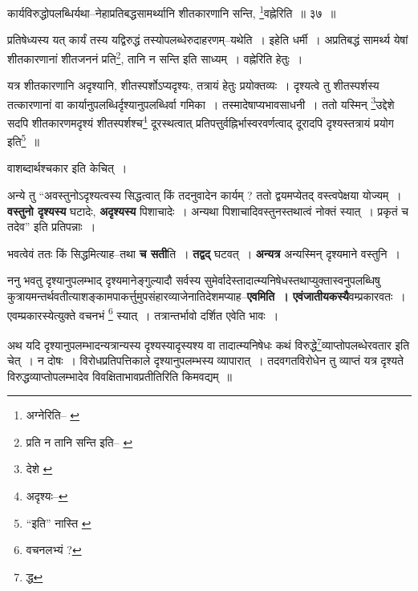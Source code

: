 \documentclass[article,12pt,a4paper]{memoir}
\begin{document}
	  \bigskip
	  \begingroup
	

	  \pstart कार्यविरुद्धोपलब्धिर्यथा--नेहाप्रतिबद्धसामर्थ्यानि शीतकारणानि सन्ति, \footnote{अग्नेरिति--\cite{dp-msB} \cite{dp-msC} \cite{dp-edP} \cite{dp-edH} \cite{dp-edE} \cite{dp-edN}}\-वह्नेरिति ॥ ३७ ॥
	\pend
      
	  \endgroup
	 

	  \pstart प्रतिषेध्यस्य यत् कार्यं तस्य यद्विरुद्धं तस्योपलब्धेरुदाहरणम्--यथेति । इहेति धर्मी । अप्रतिबद्धं सामर्थ्य येषां शीतकारणानां शीतजननं प्रति\footnote{प्रति न तानि सन्ति इति--\cite{dp-msA} \cite{dp-edP} \cite{dp-edH} \cite{dp-edE} \cite{dp-edN}}\-, तानि न सन्ति इति साध्यम् । वह्नेरिति हेतुः ।
	\pend
       

	  \pstart यत्र शीतकारणानि अदृश्यानि, शीतस्पर्शोऽप्यदृश्यः, तत्रायं हेतुः प्रयोक्तव्यः । दृश्यत्वे तु शीतस्पर्शस्य तत्कारणानां वा कार्यानुपलब्धिर्दृश्यानुपलब्धिर्वा गमिका । तस्मादेषाप्यभावसाधनी । ततो यस्मिन् \footnote{देशे \cite{dp-msA} \cite{dp-msB} \cite{dp-msC} \cite{dp-msD} \cite{dp-edP} \cite{dp-edH} \cite{dp-edE} \cite{dp-edN}}\-उद्देशे सदपि शीतकारणमदृश्यं शीतस्पर्शश्च\footnote{अदृश्यः--\cite{dp-msD-n}} दूरस्थत्वात् प्रतिपत्तुर्वह्निर्भास्वरवर्णत्वाद् दूरादपि दृश्यस्तत्रायं प्रयोग इति\footnote{“इति” नास्ति \cite{dp-msA} \cite{dp-msB} \cite{dp-edP} \cite{dp-edH} \cite{dp-edE} \cite{dp-edN}} ॥
	\pend
      
	  \endgroup
	

	  \pstart वाशब्दार्थश्चकार इति केचित् ।
	\pend
      

	  \pstart अन्ये तु “अवस्तुनोऽदृश्यत्वस्य सिद्धत्वात् किं तदनुवादेन कार्यम् ? ततो द्वयमप्येतद् वस्त्वपेक्षया योज्यम् । \textbf{वस्तुनो दृश्यस्य} घटादेः, \textbf{अदृश्यस्य} पिशाचादेः । अन्यथा पिशाचादिवस्तुनस्तथात्वं नोक्तं स्यात् । प्रकृतं च तदेव” इति प्रतिपन्नाः ।
	\pend
      

	  \pstart भवत्वेवं ततः किं सिद्धमित्याह--तथा \textbf{च सती}ति । \textbf{तद्वद्} घटवत् । \textbf{अन्य}\leavevmode{}\textbf{त्र} अन्यस्मिन् दृश्यमाने वस्तुनि ।
	\pend
      

	  \pstart ननु भवतु दृश्यानुपलम्भाद् दृश्यमानेङ्गुल्यादौ सर्वस्य सुमेर्वादेस्तादात्म्यनिषेधस्तथाप्युक्तास्वनुपलब्धिषु कुत्रायमन्तर्थवतीत्याशङ्कामपाकर्त्तुमुपसंहारव्याजेनातिदेशमप्याह--\textbf{एवमिति । एवंजातीयकस्यै}वम्प्रकारवतः । एवम्प्रकारस्येत्युक्ते वचनभं \footnote{वचनलभ्यं ?} स्यात् । तत्रान्तर्भावो दर्शित एवेति भावः ।
	\pend
      

	  \pstart अथ यदि दृश्यानुपलम्भादन्यत्रान्यस्य दृश्यस्यादृस्यश्य वा तादात्म्यनिषेधः कथं विरुद्धे\footnote{द्ध}व्याप्तोपलब्धेरवतार इति चेत् । न दोषः । विरोधप्रतिपत्तिकाले दृश्यानुपलम्भस्य व्यापारात् । तदवगतविरोधेन तु व्याप्तं यत्र दृश्यते विरुद्धव्याप्तोपलम्भादेव विवक्षिताभावप्रतीतिरिति किमवद्यम् ॥
	\pend
      
\end{document}
